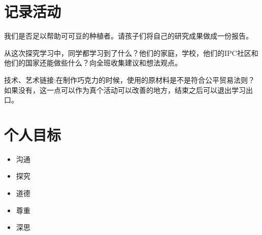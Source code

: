 \section{记录活动}
    我们是否足以帮助可可豆的种植者。请孩子们将自己的研究成果做成一份报告。\par
    从这次探究学习中，同学都学习到了什么？他们的家庭，学校，他们的IPC社区和他们的国家还能做些什么？向全班收集建议和想法观点。\par
    技术、艺术链接:在制作巧克力的时候，使用的原材料是不是符合公平贸易法则？如果没有，这一点可以作为真个活动可以改善的地方，结束之后可以退出学习出口。

\section{个人目标}

\begin{itemize}
  \item 沟通
  \item 探究
  \item 道德
  \item 尊重
  \item 深思
\end{itemize}
